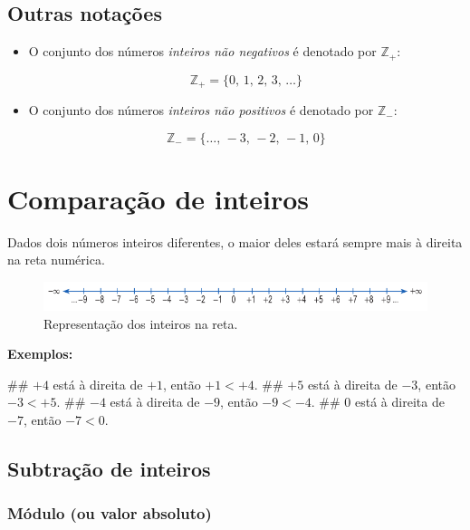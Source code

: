 \documentclass{exam}
\begin{document}
\begin{multicols*}{2}
	\subsection{Outras notações}
	
	\begin{itemize}
	
	\item O conjunto dos números \textit{inteiros não negativos} é denotado por $\mathbb{Z_+}$:
	
	\[ \mathbb{Z_+} = \{0,\, 1,\, 2,\, 3,\, \ldots\} \]
	
	\item O conjunto dos números \textit{inteiros não positivos} é denotado por $\mathbb{Z_-}$:
	
	\[ \mathbb{Z_-} = \{\ldots, \, -3,\, -2,\, -1,\, 0 \} \]
	
	\end{itemize}


\section{Comparação de inteiros}

Dados dois números inteiros diferentes, o maior deles estará sempre mais à direita na reta numérica.


\begin{figure}[H]
	\centering
	\includegraphics[scale=0.44]{fig02}
	\caption{Representação dos inteiros na reta.}
	\label{fig:retaNumerica2}
\end{figure}

		\textbf{Exemplos:}

\begin{easylist}[enumerate]
	
	## $+4$ está à direita de $+1$, então $+1 < +4$.
	## $+5$ está à direita de $-3$, então $-3 < +5$.
	## $-4$ está à direita de $-9$, então $-9 < -4$.
	## $0$ está à direita de $-7$, então $-7 < 0$.
	
\end{easylist}

	\subsection{Subtração de inteiros}

		\subsubsection{Módulo (ou valor absoluto)}
		

\end{multicols*}
\end{document}
